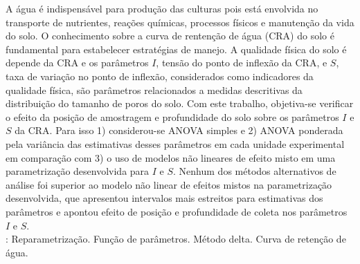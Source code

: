 A água é indispensável para produção das culturas pois está envolvida
no transporte de nutrientes, reações químicas, processos físicos e
manutenção da vida do solo. O conhecimento sobre a curva de rentenção
de água (CRA) do solo é fundamental para estabelecer estratégias de
manejo. A qualidade física do solo é depende da CRA e os parâmetros
$I$, tensão do ponto de inflexão da CRA, e $S$, taxa de variação no
ponto de inflexão, considerados como indicadores da qualidade física,
são parâmetros relacionados a medidas descritivas da distribuição do
tamanho de poros do solo. Com este trabalho, objetiva-se verificar o
efeito da posição de amostragem e profundidade do solo sobre os
parâmetros $I$ e $S$ da CRA. Para isso 1) considerou-se ANOVA simples
e 2) ANOVA ponderada pela variância das estimativas desses parâmetros
em cada unidade experimental em comparação com 3) o uso de modelos não
lineares de efeito misto em uma parametrização desenvolvida para $I$ e
$S$. Nenhum dos métodos alternativos de análise foi superior ao modelo
não linear de efeitos mistos na parametrização desenvolvida, que
apresentou intervalos mais estreitos para estimativas dos parâmetros e
apontou efeito de posição e profundidade de coleta nos parâmetros $I$
e $S$.\\
\newline
{}: Reparametrização. Função de parâmetros. Método delta. Curva de retenção de água.
